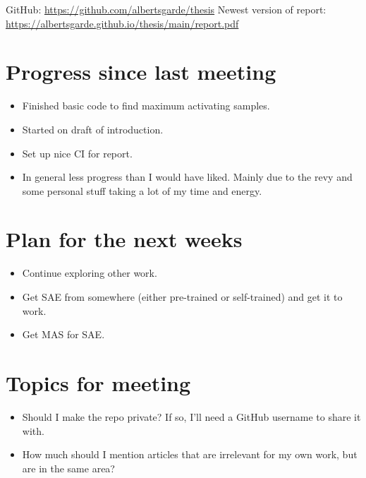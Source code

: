 \documentclass[main.tex]{subfiles}
\begin{document}
GitHub: \url{https://github.com/albertsgarde/thesis}
Newest version of report: \url{https://albertsgarde.github.io/thesis/main/report.pdf}

\section*{Progress since last meeting}
\begin{itemize}
    \item Finished basic code to find maximum activating samples.
    \item Started on draft of introduction.
    \item Set up nice CI for report.
    \item In general less progress than I would have liked.
    Mainly due to the revy and some personal stuff taking a lot of my time and energy.
\end{itemize}
\section*{Plan for the next weeks}
\begin{itemize}
    \item Continue exploring other work.
    \item Get SAE from somewhere (either pre-trained or self-trained) and get it to work.
    \item Get MAS for SAE.
\end{itemize}
\section*{Topics for meeting}
\begin{itemize}
    \item Should I make the repo private? If so, I'll need a GitHub username to share it with.
    \item How much should I mention articles that are irrelevant for my own work, but are in the same area?
\end{itemize}
\end{document}
